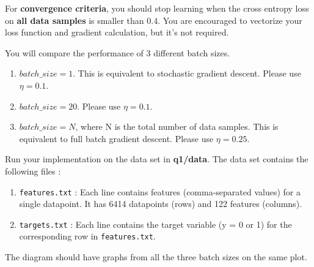For \textbf{convergence criteria}, you should stop learning when the cross entropy loss on \textbf{all data samples} is smaller than $0.4$. You are encouraged to vectorize your loss function and gradient calculation, but it's not required. 

You will compare the performance of 3 different batch sizes.
\begin{enumerate}
    \item $batch\_size=1$. This is equivalent to stochastic gradient descent. Please use $\eta=0.1$.
    \item $batch\_size=20$. Please use $\eta=0.1$.
    \item $batch\_size=N$, where N is the total number of data samples. This is equivalent to full batch gradient descent. Please use $\eta=0.25$.
\end{enumerate}

Run your implementation on the data set in \textbf{q1/data}. The data set contains the following files :
\begin{enumerate}
\item \texttt{features.txt} : Each line contains features (comma-separated values) for a single datapoint. It has 6414 datapoints (rows) and 122 features (columns). 

\item \texttt{targets.txt} : Each line contains the target variable (y = 0 or 1) for the corresponding row in \texttt{features.txt}.
\end{enumerate}



The diagram should have graphs from all the three batch sizes on the same plot. 

